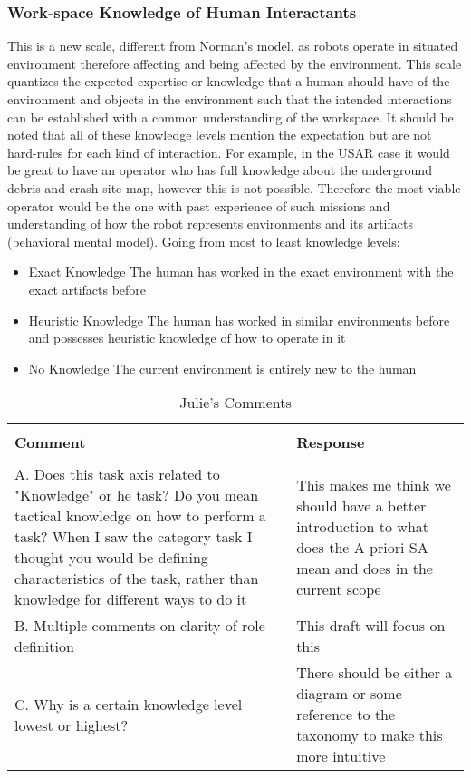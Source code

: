 \documentclass[letterpaper, 10 pt, conference]{ieeeconf} %
\begin{document}
\subsubsection{Work-space Knowledge of Human Interactants}
This is a new scale, different from Norman's model, as robots operate in situated environment
therefore affecting and being affected by the environment. This scale quantizes the expected
expertise or knowledge that a human should have of the environment and objects in the environment
such that the intended interactions can be established with a common understanding of the workspace.
It should be noted that all of these knowledge levels mention the expectation but are not hard-rules
for each kind of interaction. For example, in the USAR case it would be great to have an operator
who has full knowledge about the underground debris and crash-site map, however this is not
possible. Therefore the most viable operator would be the one with past experience of such missions
and understanding of how the robot represents environments and its artifacts (behavioral mental
model). Going from most to least knowledge levels:
\begin{itemize}{}
  \item Exact Knowledge \- The human has worked in the exact environment with the exact artifacts
    before
  \item Heuristic Knowledge \- The human has worked in similar environments before and possesses
    heuristic knowledge of how to operate in it
  \item No Knowledge \- The current environment is entirely new to the human

\end{itemize}

\begin{table*}
  \caption{Julie's Comments}
  \begin{tabular}{p{8cm} | p{8cm}}
    \hline \\
    \textbf{Comment} & \textbf{Response} \\
    \hline \\
    A. Does this task axis related to "Knowledge" or he task? Do you mean tactical knowledge on how to
    perform a task? When I saw the category task I thought you would be defining characteristics of
    the task, rather than knowledge for different ways to do it & This makes me think we should
                                                                  have a better introduction to what does the A priori SA mean and does in the current scope \\
    B. Multiple comments on clarity of role definition & This draft will focus on this \\
    C. Why is a certain knowledge level lowest or highest? & There should be either a diagram or some
                                                             reference to the taxonomy to make this more intuitive \\
    \hline
  \end{tabular}
\end{table*}


\end{document}
